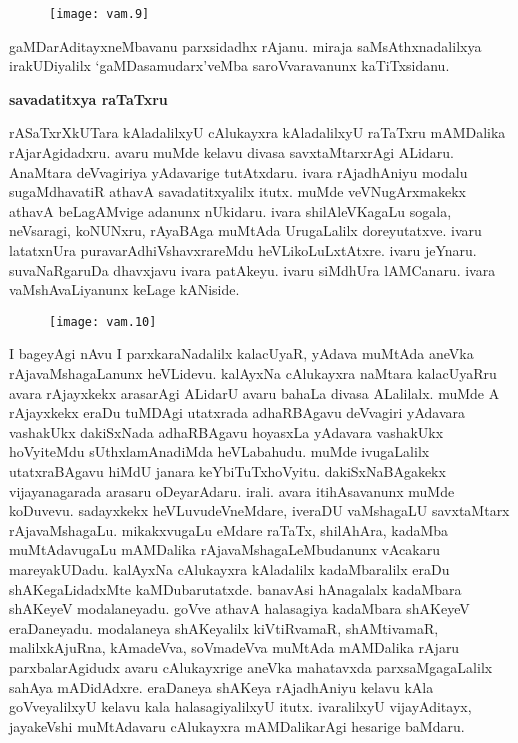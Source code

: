 \documentclass[11pt,a4size]{article}
\begin{document}
\bigskip

\begin{figure}[H]
\centering
\texttt{[image: vam.9]} 
\end{figure}



gaMDarAditayxneMbavanu parxsidadhx rAjanu. miraja saMsAthxnadalilxya
irakUDiyalilx `gaMDasamudarx'veMba saroVvaravanunx kaTiTxsidanu.

\bigskip
\centerline{\textbf{\Large savadatitxya raTaTxru}}
\medskip

rASaTxrXkUTara kAladalilxyU cAlukayxra kAladalilxyU raTaTxru mAMDalika
rAjarAgidadxru. avaru muMde kelavu divasa savxtaMtarxrAgi
ALidaru. AnaMtara deVvagiriya yAdavarige tutAtxdaru. ivara rAjadhAniyu
modalu sugaMdhavatiR athavA savadatitxyalilx itutx. muMde
veVNugArxmakekx athavA beLagAMvige adanunx nUkidaru. ivara
shilAleVKagaLu sogala, neVsaragi, koNUNxru, rAyaBAga muMtAda
UrugaLalilx doreyutatxve. ivaru latatxnUra puravarAdhiVshavxrareMdu
heVLikoLuLxtAtxre. ivaru jeYnaru. suvaNaRgaruDa dhavxjavu ivara
patAkeyu. ivaru siMdhUra lAMCanaru. ivara vaMshAvaLiyanunx keLage
kANiside.





\begin{figure}[H]
\centering
\texttt{[image: vam.10]} 
\end{figure}


I bageyAgi nAvu I parxkaraNadalilx kalacUyaR, yAdava muMtAda aneVka
rAjavaMshagaLanunx heVLidevu. kalAyxNa cAlukayxra naMtara kalacUyaRru
avara rAjayxkekx arasarAgi ALidarU avaru bahaLa divasa
ALalilalx. muMde A rAjayxkekx eraDu tuMDAgi utatxrada adhaRBAgavu
deVvagiri yAdavara vashakUkx dakiSxNada adhaRBAgavu hoyasxLa yAdavara
vashakUkx hoVyiteMdu sUthxlamAnadiMda heVLabahudu. muMde ivugaLalilx
utatxraBAgavu hiMdU janara keYbiTuTxhoVyitu. dakiSxNaBAgakekx
vijayanagarada arasaru oDeyarAdaru. irali. avara itihAsavanunx muMde
koDuvevu. sadayxkekx heVLuvudeVneMdare, iveraDU vaMshagaLU savxtaMtarx
rAjavaMshagaLu. mikakxvugaLu eMdare raTaTx, shilAhAra, kadaMba
muMtAdavugaLu mAMDalika rAjavaMshagaLeMbudanunx vAcakaru
mareyakUDadu. kalAyxNa cAlukayxra kAladalilx kadaMbaralilx eraDu
shAKegaLidadxMte kaMDubarutatxde. banavAsi hAnagalalx kadaMbara
shAKeyeV modalaneyadu. goVve athavA halasagiya kadaMbara shAKeyeV
eraDaneyadu. modalaneya shAKeyalilx kiVtiRvamaR, shAMtivamaR,
malilxkAjuRna, kAmadeVva, soVmadeVva muMtAda mAMDalika rAjaru
parxbalarAgidudx avaru cAlukayxrige aneVka mahatavxda
parxsaMgagaLalilx sahAya mADidAdxre. eraDaneya shAKeya rAjadhAniyu
kelavu kAla goVveyalilxyU kelavu kala halasagiyalilxyU
itutx. ivaralilxyU vijayAditayx, jayakeVshi muMtAdavaru cAlukayxra
mAMDalikarAgi hesarige baMdaru.
\end{document}
